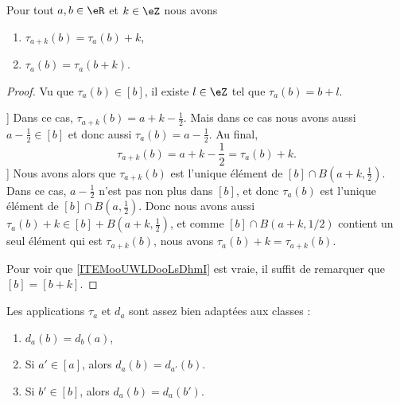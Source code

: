 \begin{lemma}	\label{LEMooAXVLooCmtsPb}
	Pour tout \( a,b\in \eR\) et \( k\in \eZ\) nous avons
	\begin{enumerate}
		\item		\label{ITEMooTELUooJoLYEF}
		      \( \tau_{a+k}(b)=\tau_a(b)+k\),
		\item		\label{ITEMooUWLDooLsDhmI}
		      \( \tau_a(b)=\tau_a(b+k)\).
	\end{enumerate}
\end{lemma}

\begin{proof}
	Vu que \( \tau_a(b)\in [b]\), il existe \( l\in \eZ\) tel que \( \tau_a(b)=b+l\).
	\begin{subproof}
		\spitem[\( a+k-\frac{ 1 }{2}\in [b]\)]
		Dans ce cas, \( \tau_{a+k}(b)=a+k-\frac{ 1 }{2}\). Mais dans ce cas nous avons aussi \( a-\frac{ 1 }{2}\in [b]\) et donc aussi \( \tau_a(b)=a-\frac{ 1 }{2}\). Au final,
		\begin{equation}
			\tau_{a+k}(b)=a+k-\frac{ 1 }{2}=\tau_a(b)+k.
		\end{equation}
		\spitem[Si \( a+k-1/2\) n'est pas dans \( [b]\)]
		Nous avons alors que \( \tau_{a+k}(b)\) est l'unique élément de \( [b]\cap B(a+k,\frac{ 1 }{2})\). Dans ce cas, \( a-\frac{ 1 }{2}\) n'est pas non plus dans \( [b]\), et donc \( \tau_a(b)\) est l'unique élément de \( [b]\cap B(a,\frac{ 1 }{2})\). Donc nous avons aussi \( \tau_a(b)+k\in [b]+B(a+k,\frac{ 1 }{2})\), et comme \( [b]\cap B(a+k,1/2)\) contient un seul élément qui est \( \tau_{a+k}(b)\), nous avons \( \tau_a(b)+k=\tau_{a+k}(b)\).
	\end{subproof}

	Pour voir que \ref{ITEMooUWLDooLsDhmI} est vraie, il suffit de remarquer que \( [b]=[b+k]\).
\end{proof}

\begin{lemma}	\label{LEMooSCXBooVXlqpp}
	Les applications \( \tau_a\) et \( d_a\) sont assez bien adaptées aux classes :
	\begin{enumerate}
		\item		\label{ITEMooLYTMooUdTFWw}
		      \( d_a(b)=d_b(a)\),
		\item	\label{ITEMooEIGSooQXMNYq}
		      Si \( a'\in [a]\), alors \( d_a(b)=d_{a'}(b)\).
		\item		\label{ITEMooVLHWooVGQSKU}
		      Si \( b'\in [b]\), alors \( d_a(b)=d_a(b')\).
	\end{enumerate}
\end{lemma}

